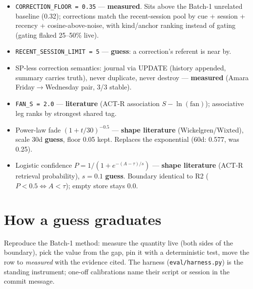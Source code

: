 \begin{itemize}
\item \texttt{CORRECTION\_FLOOR = 0.35} --- \textbf{measured}. Sits above
the Batch-1 unrelated baseline (0.32); corrections match the
recent-session pool by cue + session + recency + cosine-above-noise, with
kind/anchor ranking instead of gating (gating flaked 25--50\% live).
\item \texttt{RECENT\_SESSION\_LIMIT = 5} --- \textbf{guess}: a correction's
referent is near by.
\item SP-less correction semantics: journal via UPDATE (history appended,
summary carries truth), never duplicate, never destroy --- \textbf{measured}
(Amara Friday$\to$Wednesday pair, 3/3 stable).
\item \texttt{FAN\_S = 2.0} --- \textbf{literature} (ACT-R association
$S - \ln(\mathrm{fan})$); associative leg ranks by strongest shared tag.
\item Power-law fade $(1+t/30)^{-0.5}$ --- \textbf{shape literature}
(Wickelgren/Wixted), scale 30d \textbf{guess}, floor 0.05 kept. Replaces
the exponential (60d: 0.577, was 0.25).
\item Logistic confidence $P = 1/(1+e^{-(A-\tau)/s})$ --- \textbf{shape
literature} (ACT-R retrieval probability), $s = 0.1$ \textbf{guess}.
Boundary identical to R2 ($P<0.5 \iff A<\tau$); empty store stays 0.0.
\end{itemize}

\section{How a guess graduates}

Reproduce the Batch-1 method: measure the quantity live (both sides of the
boundary), pick the value from the gap, pin it with a deterministic test,
move the row to \textit{measured} with the evidence cited. The harness
(\texttt{eval/harness.py}) is the standing instrument; one-off
calibrations name their script or session in the commit message.
